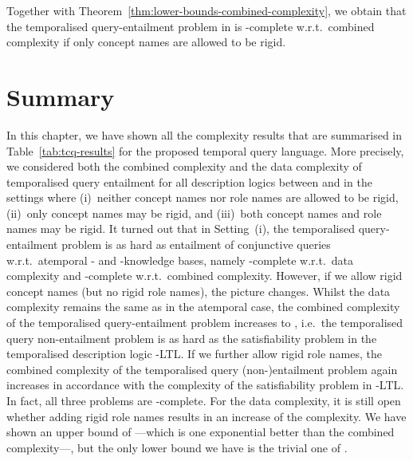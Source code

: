 \noindent
Together with Theorem~\ref{thm:lower-bounds-combined-complexity}, we obtain that
the temporalised query-entailment problem in \SHQ is \coNExpTime-complete
w.r.t.\ combined complexity if only concept names are allowed to be rigid.


\section{Summary}\label{sec:tcqs-summary}

In this chapter, we have shown all the complexity results that are summarised in
Table~\ref{tab:tcq-results} for the proposed temporal query language.  More
precisely, we considered both the combined complexity and the data complexity of
temporalised query entailment for all description logics between \ALC and \SHQ
in the settings where (i)~neither concept names nor role names are allowed to be
rigid, (ii)~only concept names may be rigid, and (iii)~both concept names and
role names may be rigid.  It turned out that in Setting~(i), the temporalised
query-entailment problem is as hard as entailment of conjunctive queries w.r.t.\
atemporal \ALC- and \SHQ-knowledge bases, namely \coNP-complete w.r.t.\ data
complexity and \ExpTime-complete w.r.t.\ combined complexity.  However, if we
allow rigid concept names (but no rigid role names), the picture changes.
Whilst the data complexity remains the same as in the atemporal case, the
combined complexity of the temporalised query-entailment problem increases to
\coNExpTime, i.e.~the temporalised query non-entailment problem is as hard as
the satisfiability problem in the temporalised description logic \ALC-LTL\@.  If
we further allow rigid role names, the combined complexity of the temporalised
query (non-)entailment problem again increases in accordance with the complexity
of the satisfiability problem in \ALC-LTL\@.  In fact, all three problems are
\TwoExpTime-complete.  For the data complexity, it is still open whether adding
rigid role names results in an increase of the complexity.  We have shown an
upper bound of \ExpTime---which is one exponential better than the combined
complexity---, but the only lower bound we have is the trivial one of \coNP.

